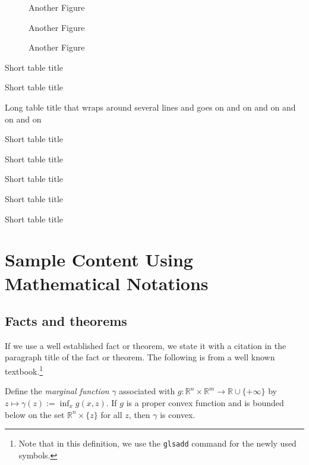 \documentclass[msc,oneside]{ubcthesis}%
\newcommand{\R}{\mathbb{R}}   %
\begin{document}
\begin{figure}%
\caption{Another Figure}%
\end{figure}

\begin{figure}%
\caption{Another Figure}%
\end{figure}

\begin{figure}%
\caption{Another Figure}%
\end{figure}

\begin{table}
\caption{Short table title}
\end{table}
\begin{table}
\caption{Short table title}
\end{table}
\begin{table}
\caption{Long table title that wraps around several lines and goes on and on and on and on and on}
\end{table}
\begin{table}
\caption{Short table title}
\end{table}
\begin{table}
\caption{Short table title}
\end{table}
\begin{table}
\caption{Short table title}
\end{table}
\begin{table}
\caption{Short table title}
\end{table}
\begin{table}
\caption{Short table title}
\end{table}


\chapter{Sample Content Using Mathematical Notations}

\section{Facts and theorems}
If we use a well established fact or theorem, we state it with a citation in the paragraph title of the fact or theorem. The following is from a well known textbook.\footnote{Note that in this definition, we use the \texttt{glsadd} command for the newly used symbols.}

\begin{fact}\cite[Theorem~IV.2.4.2]{Hiriart-Urruty:1993-ConvexAnalysis}\label{def:marginalfunc}
Define the \emph{marginal function} $\gamma$ associated with $g:\R^n\times\R^m\rightarrow \R\cup
\{+\infty\}$ by $z\mapsto \gamma(z):=\inf_x
g(x,z)$. If $g$ is a proper convex function and is bounded below on the set  $\R^n \times \{z\}$ for all $z$, then $\gamma$ is convex.
\end{fact}
\end{document}
